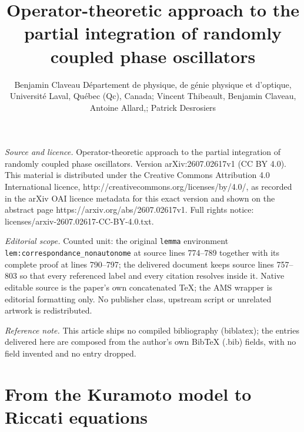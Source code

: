 \documentclass[10pt,a4paper]{amsart}
\begin{document}
\title[Operator-theoretic approach to the partial integration of ra]{Operator-theoretic approach to the partial integration of randomly coupled phase oscillators}
\author{Benjamin Claveau Département de physique, de génie physique et d'optique, Université Laval, Québec (Qc), Canada; Vincent Thibeault, Benjamin Claveau, Antoine Allard,; Patrick Desrosiers}
\date{}
\maketitle
\noindent\emph{Source and licence.} Operator-theoretic approach to the partial integration of randomly coupled phase oscillators. Version arXiv:2607.02617v1 (CC BY 4.0). This material is distributed under the Creative Commons Attribution 4.0 International licence, http://creativecommons.org/licenses/by/4.0/, as recorded in the arXiv OAI licence metadata for this exact version and shown on the abstract page https://arxiv.org/abs/2607.02617v1. Full rights notice: licenses/arxiv-2607.02617-CC-BY-4.0.txt.\par\smallskip
\noindent\textit{Editorial scope.} Counted unit: the original \texttt{lemma} environment \texttt{lem:correspondance\_nonautonome} at source lines 774--789 together with its complete proof at lines 790--797; the delivered document keeps source lines 757--803 so that every referenced label and every citation resolves inside it. Native editable source is the paper's own concatenated TeX; the AMS wrapper is editorial formatting only. No publisher class, upstream script or unrelated artwork is redistributed.
\par\smallskip\noindent\textit{Reference note.} This article ships no compiled bibliography (biblatex); the entries delivered here are composed from the author's own BibTeX (.bib) fields, with no field invented and no entry dropped.
\section{From the Kuramoto model to Riccati equations}
\label{subsec:descriptions}
\end{document}
